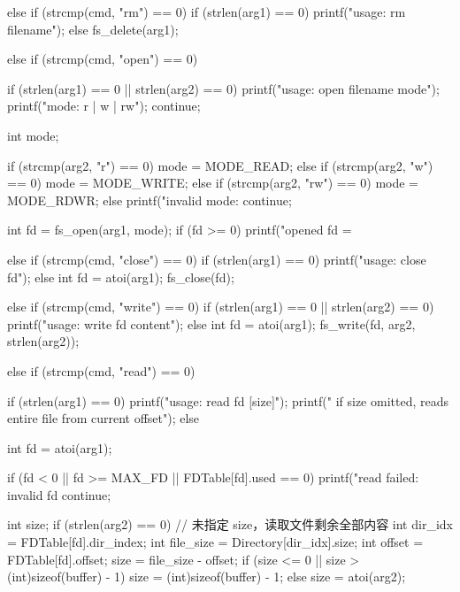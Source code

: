 \begin{ccode}
{{        else if (strcmp(cmd, "rm") == 0) {
            if (strlen(arg1) == 0) {
                printf("usage: rm filename\n");
            } else {
                fs_delete(arg1);
            }
        }

        else if (strcmp(cmd, "open") == 0) {
            if (strlen(arg1) == 0 || strlen(arg2) == 0) {
                printf("usage: open filename mode\n");
                printf("mode: r | w | rw\n");
                continue;
            }

            int mode;

            if (strcmp(arg2, "r") == 0) {
                mode = MODE_READ;
            } else if (strcmp(arg2, "w") == 0) {
                mode = MODE_WRITE;
            } else if (strcmp(arg2, "rw") == 0) {
                mode = MODE_RDWR;
            } else {
                printf("invalid mode: %
                continue;
            }

            int fd = fs_open(arg1, mode);
            if (fd >= 0) {
                printf("opened fd = %
            }
        }

        else if (strcmp(cmd, "close") == 0) {
            if (strlen(arg1) == 0) {
                printf("usage: close fd\n");
            } else {
                int fd = atoi(arg1);
                fs_close(fd);
            }
        }

        else if (strcmp(cmd, "write") == 0) {
            if (strlen(arg1) == 0 || strlen(arg2) == 0) {
                printf("usage: write fd content\n");
            } else {
                int fd = atoi(arg1);
                fs_write(fd, arg2, strlen(arg2));
            }
        }

        else if (strcmp(cmd, "read") == 0) {
            if (strlen(arg1) == 0) {
                printf("usage: read fd [size]\n");
                printf("  if size omitted, reads entire file from current offset\n");
            } else {
                int fd = atoi(arg1);

                if (fd < 0 || fd >= MAX_FD || FDTable[fd].used == 0) {
                    printf("read failed: invalid fd %
                    continue;
                }

                int size;
                if (strlen(arg2) == 0) {
                    // 未指定 size，读取文件剩余全部内容
                    int dir_idx = FDTable[fd].dir_index;
                    int file_size = Directory[dir_idx].size;
                    int offset = FDTable[fd].offset;
                    size = file_size - offset;
                    if (size <= 0 || size > (int)sizeof(buffer) - 1) {
                        size = (int)sizeof(buffer) - 1;
                    }
                } else {
                    size = atoi(arg2);
                }

}}}}
\end{ccode}
